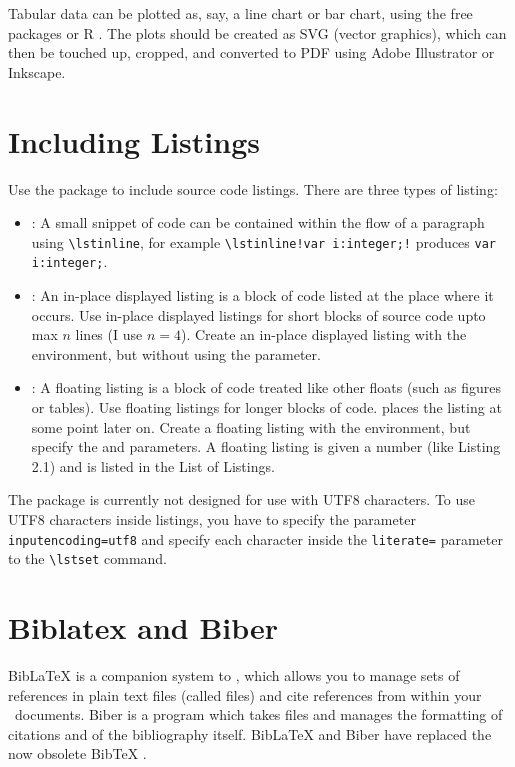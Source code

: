 Tabular data can be plotted as, say, a line chart or bar chart, using
the free packages  \parencite{gnuplot} or R \parencite{R-Project}.
The plots should be created as SVG (vector graphics), which can then
be touched up, cropped, and converted to PDF using Adobe Illustrator
or Inkscape\parencite{Inkscape}.





\section{Including Listings}

Use the  package to include source code listings.
There are three types of listing:
\begin{itemize}
\item {}: A small snippet of code can be contained
  within the flow of a paragraph using \lstinline!\lstinline!, for
  example \lstinline|\lstinline!var i:integer;!| produces
  \lstinline!var i:integer;!.

\item {}: An in-place displayed listing is a
  block of code listed at the place where it occurs. Use in-place
  displayed listings for short blocks of source code upto max $n$
  lines (I use $n=4$). Create an in-place displayed listing with the
   environment, but without using the 
  parameter.

\item {}: A floating listing is a block of code
  treated like other \LaTeXe floats (such as figures or tables). Use
  floating listings for longer blocks of code. \LaTeXe places the
  listing at some point later on. Create a floating listing with the
   environment, but specify the  and
   parameters. A floating listing is given a number
  (like Listing 2.1) and is listed in the List of Listings.

\end{itemize}

The  package is currently not designed for use with
UTF8 characters. To use UTF8 characters inside listings, you have to
specify the parameter \lstinline!inputencoding=utf8! and 
specify each character inside the \lstinline!literate=! parameter
to the \lstinline!\lstset! command.








\section{Biblatex and Biber}

BibLaTeX \parencite{BibLaTeX} is a companion system to \LaTeXe, which
allows you to manage sets of references in plain text files (called
 files) and cite references from within your
\LaTeXe\ documents.  Biber \parencite{Biber} is a program which takes
 files and manages the formatting of citations and of the
bibliography itself. BibLaTeX and Biber have replaced the now obsolete
BibTeX \parencite{BibTeX}.


